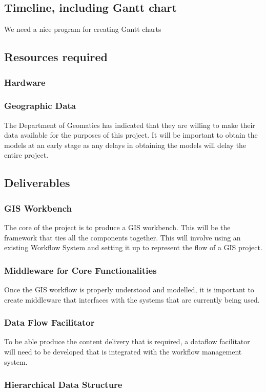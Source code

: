 \documentclass[12pt,a4paper]{article}
\begin{document}
\subsection{Timeline, including Gantt chart}
We need a nice program for creating Gantt charts
\subsection{Resources required}
\subsubsection*{Hardware}
\subsubsection*{Geographic Data}
The Department of Geomatics has indicated that they are willing to make their data available for the purposes of this project. It will be important to obtain the models at an early stage as any delays in obtaining the models will delay the entire project.
\subsection{Deliverables}
\subsubsection{GIS Workbench}
The core of the project is to produce a GIS workbench. This will
be the framework that ties all the components together. This will involve
using an existing Workflow System and setting it up to represent the
flow of a GIS project.
\subsubsection{Middleware for Core Functionalities}
Once the GIS workflow is properly understood and modelled, it is
important to create middleware that interfaces with the systems that are
currently being used.
\subsubsection{Data Flow Facilitator}
To be able produce the content delivery that is required, a dataflow
facilitator will need to be developed that is integrated with the
workflow management system.
\subsubsection{Hierarchical Data Structure}
\end{document}
